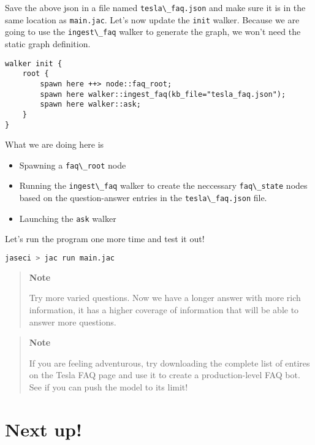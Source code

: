 Save the above json in a file named
\passthrough{\lstinline!tesla\_faq.json!} and make sure it is in the
same location as \passthrough{\lstinline!main.jac!}. Let's now update
the \passthrough{\lstinline!init!} walker. Because we are going to use
the \passthrough{\lstinline!ingest\_faq!} walker to generate the graph,
we won't need the static graph definition.

\begin{lstlisting}
walker init {
    root {
        spawn here ++> node::faq_root;
        spawn here walker::ingest_faq(kb_file="tesla_faq.json");
        spawn here walker::ask;
    }
}
\end{lstlisting}

What we are doing here is

\begin{itemize}
\tightlist
\item
  Spawning a \passthrough{\lstinline!faq\_root!} node
\item
  Running the \passthrough{\lstinline!ingest\_faq!} walker to create the
  neccessary \passthrough{\lstinline!faq\_state!} nodes based on the
  question-answer entries in the
  \passthrough{\lstinline!tesla\_faq.json!} file.
\item
  Launching the \passthrough{\lstinline!ask!} walker
\end{itemize}

Let's run the program one more time and test it out!

\begin{lstlisting}[language=bash]
jaseci > jac run main.jac
\end{lstlisting}

\begin{quote}
\textbf{Note}

Try more varied questions. Now we have a longer answer with more rich
information, it has a higher coverage of information that will be able
to answer more questions.
\end{quote}

\begin{quote}
\textbf{Note}

If you are feeling adventurous, try downloading the complete list of
entires on the Tesla FAQ page and use it to create a production-level
FAQ bot. See if you can push the model to its limit!
\end{quote}

\hypertarget{next-up}{%
\section{Next up!}\label{next-up}}

